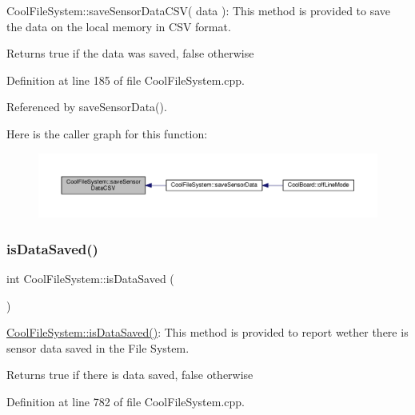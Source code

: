Cool\+File\+System\+::save\+Sensor\+Data\+C\+S\+V( data )\+: This method is provided to save the data on the local memory in C\+SV format.

\begin{DoxyReturn}{Returns}
true if the data was saved, false otherwise 
\end{DoxyReturn}


Definition at line 185 of file Cool\+File\+System.\+cpp.



Referenced by save\+Sensor\+Data().

Here is the caller graph for this function\+:
\nopagebreak
\begin{figure}[H]
\begin{center}
\leavevmode
\includegraphics[width=350pt]{db/d0c/class_cool_file_system_ab78704d5d21ce10fc6f1138ab5ab46c8_icgraph}
\end{center}
\end{figure}
\mbox{\label{class_cool_file_system_ac86a40e7c3a1842f7342f698d34324f9}} 
\subsubsection{\texorpdfstring{is\+Data\+Saved()}{isDataSaved()}}
{\footnotesize\ttfamily int Cool\+File\+System\+::is\+Data\+Saved (\begin{DoxyParamCaption}{ }\end{DoxyParamCaption})}

\hyperlink{class_cool_file_system_ac86a40e7c3a1842f7342f698d34324f9}{Cool\+File\+System\+::is\+Data\+Saved()}\+: This method is provided to report wether there is sensor data saved in the File System.

\begin{DoxyReturn}{Returns}
true if there is data saved, false otherwise 
\end{DoxyReturn}


Definition at line 782 of file Cool\+File\+System.\+cpp.



